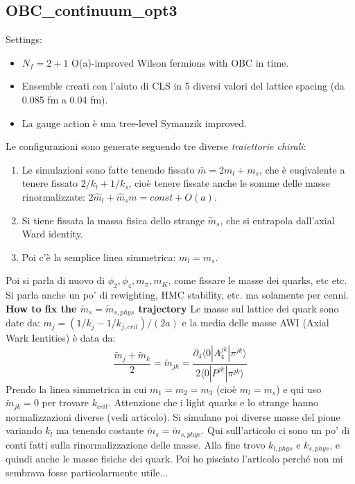\documentclass[12pt,a4paper,openright]{article}
\newcommand{\la}{\langle}
\newcommand{\ra}{\rangle}
\begin{document}
\subsection{OBC\_continuum\_opt3}
Settings:
\begin{itemize}
  \item $N_f = 2+1$ O(a)-improved Wilson fermions with OBC in time.
  \item Ensemble creati con l'aiuto di CLS in 5 diversi valori del lattice spacing (da 0.085 fm a 0.04 fm).
  \item La gauge action è una tree-level Symanzik improved. 
\end{itemize}
Le configurazioni sono generate seguendo tre diverse \textit{traiettorie chirali}:
\begin{enumerate}
  \item Le simulazioni sono fatte tenendo fissato $\bar m = 2m_l + m_s$, che è euqivalente a tenere fissato $2/k_l + 1/k_s$, cioè tenere fissate anche le somme delle masse rinormalizzate: $2\hat m_l + \hat m_sm = const + O(a)$.
  \item Si tiene fissata la massa fisica dello strange $\tilde{m}_s$, che si entrapola dall'axial Ward identity.
  \item Poi c'è la semplice linea simmetrica: $m_l = m_s$.
\end{enumerate}
Poi si parla di nuovo di $\phi_2, \phi_4, m_\pi, m_K$, come fissare le masse dei quarks, etc etc.
Si parla anche un po' di rewighting, HMC stability, etc. ma solamente per cenni.
\newline
\newline
{\bf How to fix the $\tilde{m}_s = \tilde{m}_{s,phys}$ trajectory}
\newline
Le masse sul lattice dei quark sono date da: $m_j = \left( 1/k_j - 1/k_{j,crit} \right)/(2a)$ e la media delle masse AWI (Axial Wark Ientities) è data da:
\begin{equation*}
  \frac{\tilde{m}_j+\tilde{m}_k}{2} = \tilde{m}_{jk} = \frac{\partial_4 \la 0 | A_4^{jk} | \pi^{jk} \ra}{2\la 0 | P^{jk} | \pi^{jk} \ra} 
\end{equation*}
Prendo la linea simmetrica in cui $m_1 = m_2 = m_3$ (cioè $m_l = m_s$) e qui uso $\tilde{m}_{jk} = 0$ per trovare $k_{crit}$.
Attenzione che i light quarks e lo strange hanno normalizzazioni diverse (vedi articolo).
\newline
Si simulano poi diverse masse del pione variando $k_l$ ma tenendo costante $\tilde{m}_s = \tilde{m}_{s,phys}$.
Qui sull'articolo ci sono un po' di conti fatti sulla rinormalizzazione delle masse. Alla fine trovo $k_{l,phys}$ e $k_{s,phys}$, e quindi anche le masse fisiche dei quark.
\newline \newline
Poi ho pisciato l'articolo perché non mi sembrava fosse particolarmente utile...
\end{document}
